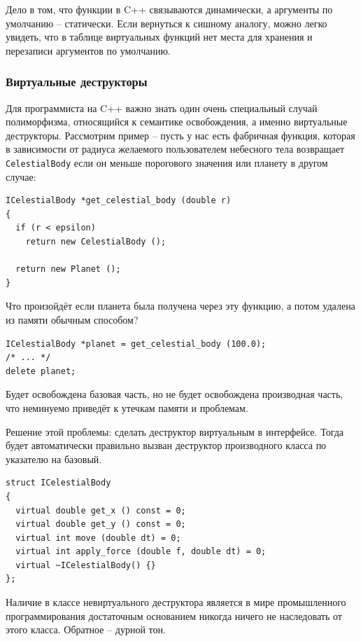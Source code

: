 \documentclass[a4paper,12pt,oneside]{article}
\begin{document}
Дело в том, что функции в C++ связываются динамически, а аргументы по умолчанию – статически. Если вернуться к сишному аналогу, можно легко увидеть, что в таблице виртуальных функций нет места для хранения и перезаписи аргументов по умолчанию.

\subsubsection{Виртуальные деструкторы}\label{VirtDestr}

Для программиста на C++ важно знать один очень специальный случай полиморфизма, относящийся к семантике освобождения, а именно виртуальные деструкторы. Рассмотрим пример – пусть у нас есть фабричная функция, которая в зависимости от радиуса желаемого пользователем небесного тела возвращает \lstinline!CelestialBody! если он меньше порогового значения или планету в другом случае:

\begin{lstlisting}
ICelestialBody *get_celestial_body (double r)
{
  if (r < epsilon)
    return new CelestialBody ();

  return new Planet ();
}
\end{lstlisting}

Что произойдёт если планета была получена через эту функцию, а потом удалена из памяти обычным способом?

\begin{lstlisting}
ICelestialBody *planet = get_celestial_body (100.0);
/* ... */
delete planet;
\end{lstlisting}

Будет освобождена базовая часть, но не будет освобождена производная часть, что неминуемо приведёт к утечкам памяти и проблемам. 

Решение этой проблемы: сделать деструктор виртуальным в интерфейсе. Тогда будет автоматически правильно вызван деструктор производного класса по указателю на базовый.

\begin{lstlisting}
struct ICelestialBody
{
  virtual double get_x () const = 0;
  virtual double get_y () const = 0;
  virtual int move (double dt) = 0;
  virtual int apply_force (double f, double dt) = 0;
  virtual ~ICelestialBody() {}
};
\end{lstlisting}

Наличие в классе невиртуального деструктора является в мире промышленного программирования достаточным основанием никогда ничего не наследовать от этого класса. Обратное – дурной тон. 
\end{document}
